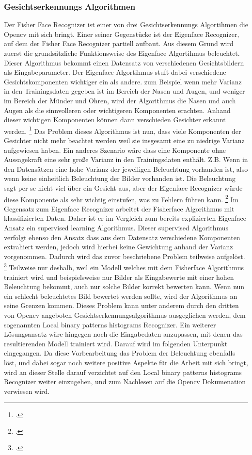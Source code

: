 \documentclass[12pt, a4paper]{scrbook}
\begin{document}
\subsubsection{Gesichtserkennungs Algorithmen}
Der Fisher Face Recognizer ist einer von drei Gesichtserkennungs Algortihmen die Opencv mit sich bringt. Einer seiner Gegenstücke ist der Eigenface Recognizer, auf dem der Fisher Face Recognizer partiell aufbaut. Aus diesem Grund wird zuerst die grundsätzliche Funktionsweise des Eigenface Algortihmus beleuchtet. Dieser Algorithmus bekommt einen Datensatz von verschiedenen Gesichtsbildern als Eingabeparameter. Der Eigenface Algortihmus stuft dabei verschiedene Gesichtskomponenten wichtiger ein als andere. zum Beispiel wenn mehr Varianz in den Trainingsdaten gegeben ist im Bereich der Nasen und Augen, und weniger im Bereich der Münder und Ohren,  wird der Algorithmus die Nasen und auch Augen als die sinnvolleren oder wichtigeren Komponenten erachten. Anhand dieser wichtigen Komponenten können dann verschieden Gesichter erkannt werden.
\footcite[Vgl.][]{Eigenface}
Das Problem dieses Algorithmus ist nun, dass viele Komponenten der Gesichter nicht mehr beachtet werden weil sie insgesamt eine zu niedrige Varianz aufgewiesen haben. Ein anderes Szenario wäre dass eine Komponente ohne Aussagekraft eine sehr große Varianz in den Trainingsdaten enthält. Z.B. Wenn in den Datensätzen eine hohe Varianz der jeweiligen Beleuchtung vorhanden ist, also wenn keine einheitlich Beleuchtung der Bilder vorhanden ist. Die Beleuchtung sagt per se nicht viel über ein Gesicht aus, aber der Eigenface Recognizer würde diese Komponente als sehr wichtig einstufen, was zu Fehlern führen kann.
\footcite[Vgl.][]{Fisherface}
Im Gegensatz zum Eigenface Recognizer arbeitet der Fisherface Algorithmus mit klassifizierten Daten. Daher ist er im Vergleich zum bereits explizierten Eigenface Ansatz ein supervised learning Algorithmus. Dieser supervised Algorithmus verfolgt ebenso den Ansatz dass aus dem Datensatz verschiedene Komponenten extrahiert werden, jedoch wird hierbei keine Gewichtung anhand der Varianz vorgenommen. Dadurch wird das zuvor beschriebene Problem teilweise aufgelöst. 
\footcite[Vgl.][How to fix this issue]{Eigenface}
Teilweise nur deshalb, weil ein Modell welches mit dem Fisherface Algorithmus trainiert wird und beispielsweise nur Bilder als Eingabewerte mit einer hohen Beleuchtung bekommt, auch nur solche Bilder korrekt bewerten kann. Wenn nun ein schlecht beleuchtetes Bild bewertet werden sollte, wird der Algorithmus an seine Grenzen kommen.
Dieses Problem kann unter anderem durch den dritten von Opencv angeboten Gesichtserkennungsalgorithmus ausgeglichen werden, dem sogenannten Local binary patterns histograms Recognizer. Ein weiterer Lösungsansatz wäre hingegen noch die Eingabedaten anzupassen, mit denen das resultierenden Modell trainiert wird. Darauf wird im folgenden Unterpunkt \pageref{subsec: Eingabe Daten} eingegangen. Da diese Vorbearbeitung das Problem der Beleuchtung ebenfalls löst, und dabei sogar noch weitere positive Aspekte für die Arbeit mit sich bringt, wird an dieser Stelle darauf verzichtet auf den Local binary patterns histograms Recognizer weiter einzugehen, und zum Nachlesen auf die Opencv Dokumenation verwiesen wird. 
\end{document}

